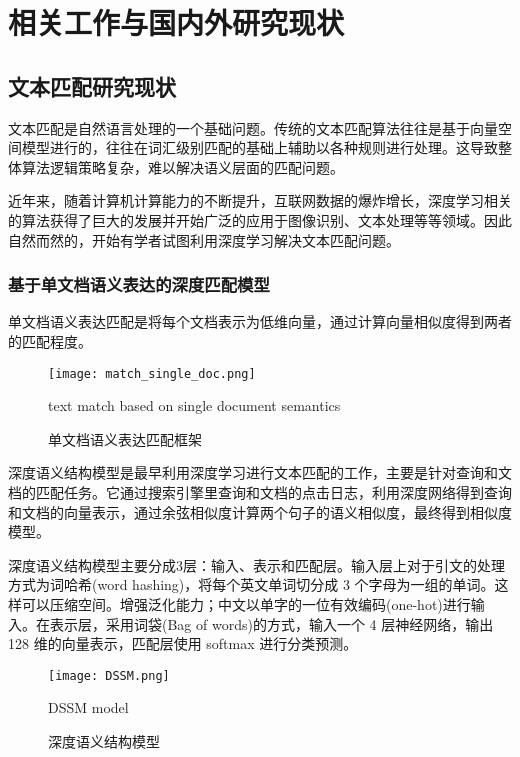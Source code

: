 
\chapter{相关工作与国内外研究现状}
\label{chapter:relate}

\section{文本匹配研究现状}

文本匹配是自然语言处理的一个基础问题。传统的文本匹配算法往往是基于向量空间模型进行的，往往在词汇级别匹配的基础上辅助以各种规则进行处理。这导致整体算法逻辑策略复杂，难以解决语义层面的匹配问题。

近年来，随着计算机计算能力的不断提升，互联网数据的爆炸增长，深度学习相关的算法获得了巨大的发展并开始广泛的应用于图像识别、文本处理等等领域。因此自然而然的，开始有学者试图利用深度学习解决文本匹配问题。

\subsection{基于单文档语义表达的深度匹配模型}
单文档语义表达匹配是将每个文档表示为低维向量，通过计算向量相似度得到两者的匹配程度。
\begin{figure}[!htbp]\centering
  \texttt{[image: match\_single\_doc.png]}
  \caption{单文档语义表达匹配框架}{text match based on single document semantics}
  \label{fig:text match based on single document semantics}       %
\end{figure}

深度语义结构模型\cite{Huang2013LearningDS}是最早利用深度学习进行文本匹配的工作，主要是针对查询和文档的匹配任务。它通过搜索引擎里查询和文档的点击日志，利用深度网络得到查询和文档的向量表示，通过余弦相似度计算两个句子的语义相似度，最终得到相似度模型。

深度语义结构模型主要分成3层：输入、表示和匹配层。输入层上对于引文的处理方式为词哈希(word hashing)，将每个英文单词切分成 3 个字母为一组的单词。这样可以压缩空间。增强泛化能力；中文以单字的一位有效编码(one-hot)进行输入。在表示层，采用词袋(Bag of words)的方式，输入一个 4 层神经网络，输出 128 维的向量表示，匹配层使用 softmax 进行分类预测。

\begin{figure}[!htbp]\centering
  \texttt{[image: DSSM.png]}
  \caption{深度语义结构模型}{DSSM model}
  \label{fig:DSSM}       %
\end{figure}

